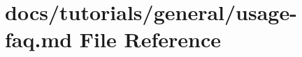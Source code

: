 \hypertarget{usage-faq_8md}{}\section{docs/tutorials/general/usage-\/faq.md File Reference}
\label{usage-faq_8md}
